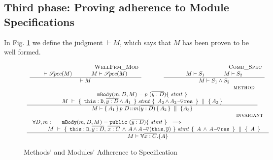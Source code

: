 \subsection{Third phase: Proving adherence to Module Specifications}
\label{sect:wf}

In Fig. \ref{f:wf} we  define the judgment $\vdash M$, which says that  
$M$ has been proven to be well formed. 
 

\begin{figure}[thb]
$
\begin{array}{l}
\begin{array}{lcl}
\inferruleSDNarrow 
{~ \strut  {\sc{WellFrm\_Mod}}}
{  \vdash \SpecOf {M}
  \hspace{1.2cm}  M \vdash \SpecOf {M}
}
{
\vdash M  
}
& \hspace{0.7cm} &
\inferruleSDNarrow 
{~ \strut   {\sc{Comb\_Spec}}}
{  
M \vdash S_1 \hspace{1.2cm}  M \vdash S_2
}
{
M \vdash S_1 \wedge S_2
}
\end{array}
\\
\inferruleSD 
{~ \strut \hspace{6.5cm} {\sc{method}}}
{  
 \prg{mBody}(m,D,M)=p \ (\overline{y:D})\{\  stmt \ \}       
    \\
  {\hprovesN{M} { \ \prg{this}:\prg{D}, \overline{y:D}\, {\wedge\, A_1}\  } %
  {\ stmt\ } {\ A_2\, \sdN{\wedge\, \PushASLong {\prg{res}} {A_2}} \ }   {A_3} } 
}
{
M \vdash {\mprepostN {A_1}{p\ D}{m}{y}{D}{A_2} {A_3} }
}
\\
\inferruleSD 
{~ \strut \hspace{6.5cm} {\sc{invariant}}}
{
\begin{array}{l}
\forall  D,  m:\ \ \  \ \  \prg{mBody}(m,D,M)=\prg{public} \ (\overline{y:D})\{\  stmt \ \}      \ \ \Longrightarrow  
  \\
   ~ \strut \hspace{0.3cm}  \ \ \ 
 \begin{array}{l}
   \hprovesN {M}  
{ \ \prg{this}:\prg{D}, \overline{y:D},\,   \overline{x:C} \, \wedge\,  A \, \sdN{\wedge\, \PushASLong {(\prg{this},\overline y)} {A}}\, }  
  	{\ stmt\ }   
	 {\  A\, \wedge\, \PushASLong {\prg{res}} {A} \ }  
{\ A \ }
 \end{array}
 \end{array}
}
{
M \vdash \TwoStatesN{ \overline{x:C}} {A}
}
\end{array}
$
\caption{Methods' and Modules' Adherence to Specification}
\label{f:wf}
\end{figure}

